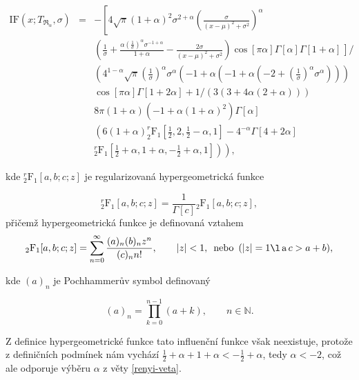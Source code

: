 \begin{eqnarray}
\mathrm{IF}(x;T_{\mathfrak{R}_\alpha},\sigma) &=& -\left[4 \sqrt{\pi } (1+\alpha )^2 \sigma ^{2+\alpha } \left(\frac{\sigma }{(x-\mu )^2+\sigma ^2}\right)^{\alpha} \right. \nonumber\\
&&\left(\frac{1}{\sigma }+\frac{\alpha  \left(\frac{1}{\sigma }\right)^{\alpha } \sigma ^{-1+\alpha }}{1+\alpha }-\frac{2 \sigma }{(x-\mu )^2+\sigma ^2}\right) \left. \cos[\pi  \alpha ] \Gamma[\alpha ] \Gamma[1+\alpha ]  \frac{}{} \right] / \nonumber \\ %
&&\left(4^{1-\alpha } \sqrt{\pi } \left(\frac{1}{\sigma }\right)^{\alpha } \sigma ^{\alpha } \left(-1+\alpha  \left(-1+\alpha  \left(-2+\left(\frac{1}{\sigma }\right)^{\alpha } \sigma ^{\alpha }\right)\right)\right) \right.\nonumber \\ 
&&\left. \cos[\pi  \alpha ] \Gamma[1+2 \alpha ]+1/(3 (3+4 \alpha  (2+\alpha )))\right. \nonumber \\
&& 8 \pi  (1+\alpha ) \left(-1+\alpha  (1+\alpha )^2\right) \Gamma[\alpha ] \nonumber \\
&& \left(6 (1+\alpha ) ^r_2\mathrm{F}_1\left[\frac{1}{2},2,\frac{1}{2}-\alpha ,1\right]-4^{-\alpha } \Gamma[4+2 \alpha ] \right. \nonumber \\
&& \left. \left. ^r_2\mathrm{F}_1\left[\frac{1}{2}+\alpha ,1+\alpha ,-\frac{1}{2}+\alpha ,1\right]\right)\right),
\end{eqnarray}

\noindent kde $^r_2\mathrm{F}_1[a,b;c;z]$ je regularizovaná hypergeometrická funkce 

\begin{equation}
	^r_2\mathrm{F}_1[a,b;c;z] = {\frac{1}{\Gamma[c]}} {_2\mathrm{F}_1}[a,b;c;z],
\end{equation}
přičemž hypergeometrická funkce je definovaná vztahem
\begin{equation}
	{_2\mathrm{F}_1}[a,b;c;z]=\sum _{n=0}^{\infty } \frac{(a)_n (b)_n z^n}{ (c)_n n!}, \qquad |z|<1, \, \text{ nebo } \, (|z|=1\l  \,\text{a} \,  c>a+b),
\end{equation}

\noindent kde $(a)_n$ je Pochhammerův symbol definovaný

\begin{equation}
(a)_n=\prod _{k=0}^{n-1} (a+k), \qquad n \in \mathbb{N}.
\end{equation}

\noindent Z definice hypergeometrické funkce tato influenční funkce však neexistuje, protože z definičních podmínek nám vychází $\frac{1}{2}+\alpha  + 1+\alpha < -\frac{1}{2}+\alpha $, tedy $\alpha < -2$, což ale odporuje výběru $\alpha$ z věty \ref{renyi-veta}.

